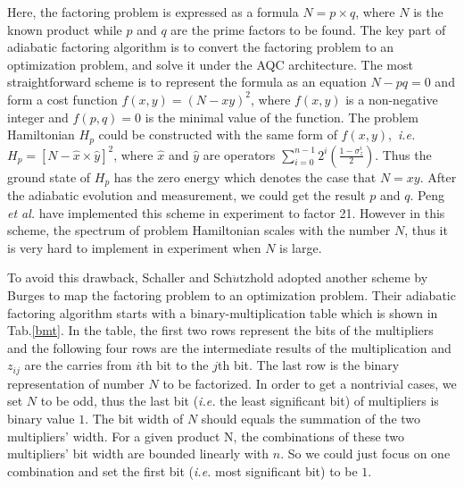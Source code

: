 \documentclass[twocolumn,showpacs,twoside,10pt,prl]{revtex4}
\begin{document}
Here, the factoring problem is expressed as a formula $N=p\times q$, where
$N$ is the known product while $p$ and $q$ are the prime factors to be found.
The key part of adiabatic factoring algorithm is to convert the factoring problem to an optimization problem,
and solve it under the AQC architecture. The most straightforward scheme
is to represent the formula as an equation
$N-pq=0$ and form a cost function $f(x,y)=(N - xy)^2$, where $f(x,y)$ is a
non-negative integer and $f(p,q)=0$ is the minimal value of the
function. The problem Hamiltonian $H_p$ could be constructed with the same
form of $f(x,y), $ \emph{i.e.} $H_p=[N - \hat{x}\times\hat{y}]^2$,
where $\hat{x}$ and $\hat{y}$ are operators $\sum_{i=0}^{n-1}{2^i\left(\frac{1-\sigma^{i}_z}{2}\right) }$. Thus
the ground state of $H_p$ has the zero energy which denotes the case
that $N=xy$. After the adiabatic evolution and measurement, we
could get the result $p$ and $q$. Peng \emph{et al.}
\cite{peng_2008} have implemented this scheme in experiment to factor
21. However in this scheme, the spectrum of problem Hamiltonian
scales with the number $N$, thus it is very hard to implement in
experiment when $N$ is large.



To avoid this drawback, Schaller and Sch$\ddot{u}$tzhold\cite{Schaller} adopted
another scheme by Burges\cite{Burges} to map the factoring problem
to an optimization problem. Their adiabatic factoring algorithm
starts with a binary-multiplication table which is shown in
Tab.\ref{bmt}. In the table, the first two rows represent the bits
of the multipliers and the following four rows are the intermediate
results of the multiplication and $z_{ij}$ are the carries from $i$th
bit to the $j$th bit. The last row is the binary representation of number $N$
to be factorized. In order to get a nontrivial cases, we set $N$ to
be odd, thus the last bit (\emph{i.e.}  the least significant bit) of
multipliers is binary value $1$. The bit width of $N$ should equals
the summation of the two multipliers' width. For a given product N, the combinations of
these two multipliers' bit width are bounded linearly with $n$. So we
could just focus on one combination and set the first bit
(\emph{i.e.} most significant bit) to be $1$.
\end{document}
